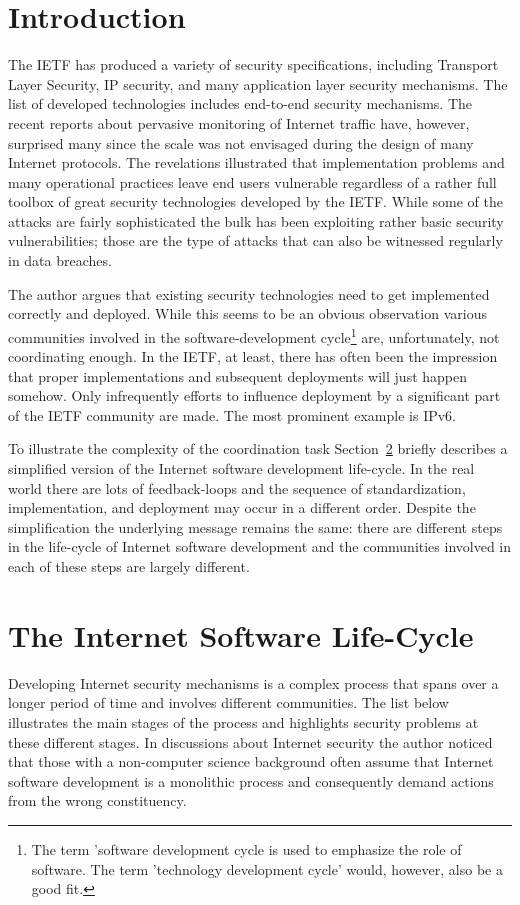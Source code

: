 \documentclass[peerreview, a4paper, 7pt]{IEEEtran}
\begin{document}
\section{Introduction}

The IETF has produced a variety of security specifications, including Transport Layer Security, IP security, and many application layer security mechanisms. The list of developed technologies includes end-to-end security mechanisms. The recent reports about pervasive monitoring of Internet traffic have, however, surprised many since the scale was not envisaged during the design of many Internet protocols. The revelations illustrated that implementation problems and many operational practices leave end users vulnerable regardless of a rather full toolbox of great security technologies developed by the IETF. While some of the attacks are fairly sophisticated the bulk has been exploiting rather basic security vulnerabilities; those are the type of attacks that can also be witnessed regularly in data breaches.

The author argues that existing security technologies need to get implemented correctly and deployed. While this seems to be an obvious observation various communities involved in the software-development cycle\footnote{The term 'software development cycle is used to emphasize the role of software. The term 'technology development cycle' would, however, also be a good fit.} are, unfortunately, not coordinating enough. In the IETF, at least, there has often been the impression that proper implementations and subsequent deployments will just happen somehow. Only infrequently efforts to influence deployment by a significant part of the IETF community are made. The most prominent example is IPv6. 

To illustrate the complexity of the coordination task Section~\ref{cycle} briefly describes a simplified version of the Internet software development life-cycle. In the real world there are lots of feedback-loops and the sequence of standardization, implementation, and deployment may occur in a different order. Despite the simplification the underlying message remains the same: there are different steps in the life-cycle of Internet software development and the communities involved in each of these steps are largely different.

\section[The Internet Software Life-Cycle]{The Internet Software Life-Cycle}
\label{cycle} 
Developing Internet security mechanisms is a complex process that spans over a longer period of time and involves different communities. The list below illustrates the main stages of the process and highlights security problems at these different stages. In discussions about Internet security the author noticed that those with a non-computer science background often assume that Internet software development is a monolithic process and consequently demand actions from the wrong constituency.
\end{document}
